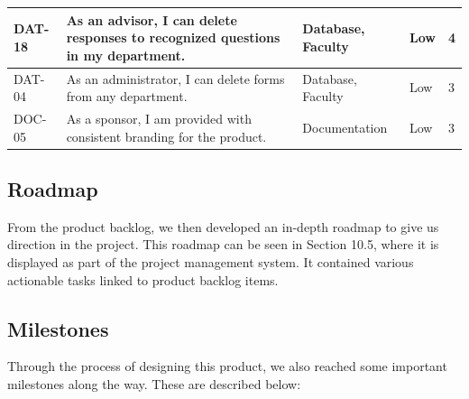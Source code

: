 \documentclass[titlepage, 12pt]{article}
\begin{document}
\begin{center}
\begin{longtable}{ L{1.5cm} L{4cm} L{3cm} L{1.5cm} L{1.5cm} }
\midrule
DAT-18 & As an advisor, I can delete responses to recognized questions in my department.                                                   & Database, Faculty     & Low    & 4  \\
\midrule
DAT-04 & As an administrator, I can delete forms from any department.                                                                      & Database, Faculty     & Low    & 3  \\
\midrule
DOC-05 & As a sponsor, I am provided with consistent branding for the product.                                                             & Documentation         & Low    & 3 \\
\bottomrule

        \end{longtable}
\end{center}

\subsection{Roadmap}

From the product backlog, we then developed an in-depth roadmap to give us direction in the project. This roadmap can be seen in Section 10.5, where it is displayed as part of the project management system. It contained various actionable tasks linked to product backlog items.

\subsection{Milestones}

Through the process of designing this product, we also reached some important milestones along the way. These are described below:
\end{document}
